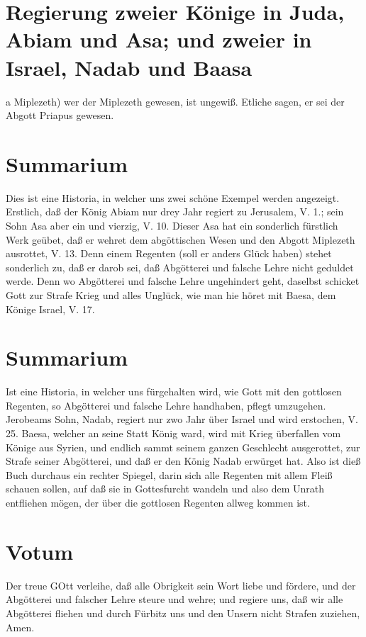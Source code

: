 \section[Regierung zweier Könige in Juda, Abiam und Asa;]{Regierung zweier Könige in Juda, Abiam und Asa; und zweier in Israel, Nadab und Baasa}

a Miplezeth) wer der Miplezeth gewesen, ist ungewiß. Etliche sagen, er sei der Abgott Priapus gewesen.

\section{Summarium}

Dies ist eine Historia, in welcher uns zwei schöne Exempel werden angezeigt. Erstlich, daß der König Abiam nur drey Jahr regiert zu Jerusalem, V. 1.; sein Sohn Asa aber ein und vierzig, V. 10. Dieser Asa hat ein sonderlich fürstlich Werk geübet, daß er wehret dem abgöttischen Wesen und den Abgott Miplezeth ausrottet, V. 13. Denn einem Regenten (soll er anders Glück haben) stehet sonderlich zu, daß er darob sei, daß Abgötterei und falsche Lehre nicht geduldet werde. Denn wo Abgötterei und falsche Lehre ungehindert geht, daselbst schicket Gott zur Strafe Krieg und alles Unglück, wie man hie höret mit Baesa, dem Könige Israel, V. 17.

\section{Summarium}

Ist eine Historia, in welcher uns fürgehalten wird, wie Gott mit den gottlosen Regenten, so Abgötterei und falsche Lehre handhaben, pflegt umzugehen. Jerobeams Sohn, Nadab, regiert nur zwo Jahr über Israel und wird erstochen, V. 25. Baesa, welcher an seine Statt König ward, wird mit Krieg überfallen vom Könige aus Syrien, und endlich sammt seinem ganzen Geschlecht ausgerottet, zur Strafe seiner Abgötterei, und daß er den König Nadab erwürget hat. Also ist dieß Buch durchaus ein rechter Spiegel, darin sich alle Regenten mit allem Fleiß schauen sollen, auf daß sie in Gottesfurcht wandeln und also dem Unrath entfliehen mögen, der über die gottlosen Regenten allweg kommen ist.

\section{Votum}

Der treue GOtt verleihe, daß alle Obrigkeit sein Wort liebe und fördere, und der Abgötterei und falscher Lehre steure und wehre; und regiere uns, daß wir alle Abgötterei fliehen und durch Fürbitz uns und den Unsern nicht Strafen zuziehen, Amen.

